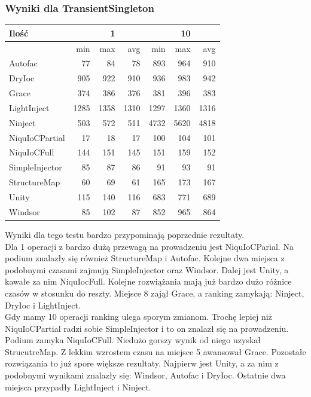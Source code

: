 \documentclass[12pt]{article}
\begin{document}
\subsubsection{Wyniki dla TransientSingleton}
\begin{center}
\begin{small}
	\begin{tabular}{ | l | r r r | r r r | }
    		\hline
Ilość & & 1 & & & 10 & \\ \hline
 & min & max & avg & min & max & avg \\ \hline
Autofac & 77 & 84 & 78 & 893 & 964 & 910 \\ \hline
DryIoc & 905 & 922 & 910 & 936 & 983 & 942 \\ \hline
Grace & 374 & 386 & 376 & 381 & 396 & 383 \\ \hline
LightInject & 1285 & 1358 & 1310 & 1297 & 1360 & 1316 \\ \hline
Ninject & 503 & 572 & 511 & 4732 & 5620 & 4818 \\ \hline
NiquIoCPartial & 17 & 18 & 17 & 100 & 104 & 101 \\ \hline
NiquIoCFull & 144 & 151 & 145 & 151 & 159 & 152 \\ \hline
SimpleInjector & 85 & 87 & 86 & 91 & 93 & 91 \\ \hline
StructureMap & 60 & 69 & 61 & 165 & 173 & 167 \\ \hline
Unity & 115 & 140 & 116 & 683 & 771 & 689 \\ \hline
Windsor & 85 & 102 & 87 & 852 & 965 & 864 \\ \hline
  	\end{tabular}
\end{small}
\end{center}
Wyniki dla tego testu bardzo przypominają poprzednie rezultaty.\\
Dla 1 operacji z bardzo dużą przewagą na prowadzeniu jest NiquIoCParial. Na podium znalazły się również StructureMap i Autofac. Kolejne dwa miejsca z podobnymi czasami zajmują SimpleInjector oraz Windsor. Dalej jest Unity, a kawałe za nim NiquIocFull. Kolejne rozwiążania mają już bardzo dużo różnice czasów w stosunku do reszty. Miejsce 8 zajął Grace, a ranking zamykają: Ninject, DryIoc i LightInject.\\
Gdy mamy 10 operacji ranking ulega sporym zmianom. Trochę lepiej niż NiquIoCPartial radzi sobie SimpleInjector i to on znalazł się na prowadzeniu. Podium zamyka NiquIoCFull. Niedużo gorszy wynik od niego uzyskał StrucutreMap. Z lekkim wzrostem czasu na miejsce 5 awansował Grace. Pozostałe rozwiązania to już spore większe rezultaty. Najpierw jest Unity, a za nim z podobnymi wynikami znalazły się: Windsor, Autofac i DryIoc. Ostatnie dwa miejsca przypadły LightInject i Ninject.
\end{document}
